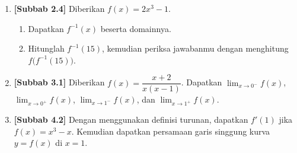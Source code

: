 \documentclass[10pt,openany,a4paper]{article}
\theoremstyle{definition}
\theoremstyle{definition}
\theoremstyle{plain}
\begin{document}
\begin{enumerate}
    \item \textbf{[Subbab 2.4]} Diberikan $f(x)=2x^3-1$.
    \begin{enumerate}
        \item Dapatkan $f^{-1}(x)$ beserta domainnya.
        \item Hitunglah $f^{-1}(15)$, kemudian periksa jawabanmu dengan menghitung $f\big(f^{-1}(15)\big)$.
    \end{enumerate}

    \item \textbf{[Subbab 3.1]} Diberikan $f(x)=\dfrac{x+2}{x(x-1)}$. Dapatkan $\displaystyle\lim_{x\to 0^-}f(x)$, $\displaystyle\lim_{x\to 0^+}f(x)$, $\displaystyle\lim_{x\to 1^-}f(x)$, dan $\displaystyle\lim_{x\to 1^+}f(x)$.

    \item \textbf{[Subbab 4.2]} Dengan menggunakan definisi turunan, dapatkan $f'(1)$ jika $f(x)=x^3-x$. Kemudian dapatkan persamaan garis singgung kurva $y=f(x)$ di $x=1$.
\end{enumerate}

\newpage
\end{document}
